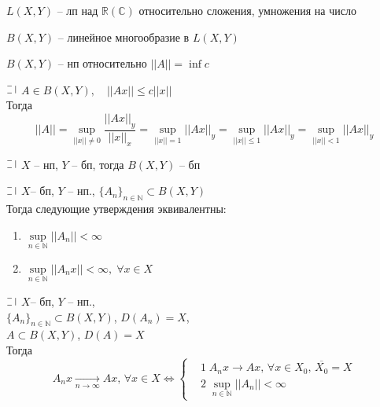 \begin{utv} [1]
	$L(X, Y)$ -- лп над $\mathbb{R}(\mathbb{C})$ относительно сложения, умножения на число
\end{utv}

\begin{utv} [2]
	$B(X, Y)$ -- линейное многообразие в $L(X, Y)$
\end{utv}

\begin{utv} [3]
	$B(X, Y)$ -- нп относительно $||A||= \inf c$
\end{utv}

\begin{lemma}
  $\letus$ $A \in B(X, Y), \quad ||Ax|| \le c||x||$\\ 
  Тогда
  $$ ||A|| = \sup_{||x|| \ne 0}\frac{||Ax||_{y}}{||x||_{x}} = \sup_{||x|| = 1}||Ax||_{y} = 
  \sup_{||x|| \le 1}||Ax||_{y} = \sup_{||x|| < 1}||Ax||_{y}$$
\end{lemma}

\begin{theorem}
	$\letus$ $X$ -- нп, $Y$ -- бп, тогда $B(X, Y)$ -- бп
\end{theorem}

\begin{theorem}
  $\letus$ $X$-- бп, $Y$ -- нп., $ \{A_n\}_{n \in \mathbb{N}} \subset B(X,Y)$\\
  Тогда следующие утверждения эквивалентны:
  \begin{minipage}[t]{0.8\linewidth}\begin{enumerate}[itemsep=1mm]
      \item $\sup\limits_{n \in \mathbb{N}} ||A_n|| < \infty$
      \item $\sup\limits_{n \in \mathbb{N}} ||A_n x|| < \infty, \; \forall x \in X$
  \end{enumerate}\end{minipage}
\end{theorem}

\begin{theorem}
  $\letus$ $X$-- бп, $Y$ -- нп., \\ $ \{A_n\}_{n \in \mathbb{N}} \subset B(X,Y)$, $D(A_n) = X$, \\ $A\subset B(X,Y)$, $D(A) = X$\\
  Тогда
  $$A_n x \underset{n\to \infty}\longrightarrow Ax, \, \forall x \in X \Longleftrightarrow \left\{
  \begin{aligned}
    & 1\; A_n x \longrightarrow Ax, \, \forall x \in X_0, \,\overline{X_0} = X\\
    & 2\; \sup\limits_{n \in \mathbb{N}} ||A_n|| < \infty
  \end{aligned} \right.$$
\end{theorem}

